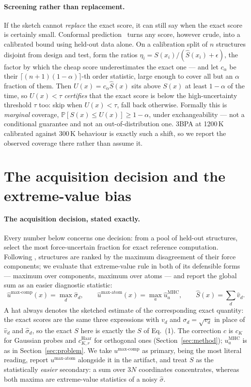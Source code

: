 \documentclass{article}
\begin{document}
\paragraph{Screening rather than replacement.}
If the sketch cannot \emph{replace} the exact score, it can still say when the exact score is
certainly small. Conformal prediction~\citep{vovk2005,crc} turns any score, however crude, into a
calibrated bound using held-out data alone. On a calibration split of $n$ structures disjoint from
design and test, form the ratios $\eta_i=S(x_i)/(\widehat S(x_i)+\epsilon)$, the factor by which
the cheap score underestimates the exact one --- and let $c_\alpha$ be their
$\lceil (n+1)(1-\alpha)\rceil$-th order statistic, large enough to cover all but an $\alpha$
fraction of them. Then $U(x)=c_\alpha\widehat S(x)$ sits above $S(x)$ at least $1-\alpha$ of the
time, so $U(x)<\tau$ \emph{certifies} that the exact score is below the high-uncertainty threshold
$\tau$ too: skip when $U(x)<\tau$, fall back otherwise. Formally this is \emph{marginal} coverage,
$\mathbb P[S(x)\le U(x)]\ge 1-\alpha$, under exchangeability --- not a conditional guarantee and not
an out-of-distribution one. 3BPA at 1200\,K calibrated against 300\,K behaviour is exactly such a
shift, so we report the observed coverage there rather than assume it.


\section{The acquisition decision and the extreme-value bias}
\label{app:acq}
\paragraph{The acquisition decision, stated exactly.}
\label{par:acq}
Every number below concerns one decision: from a pool of held-out structures, select the most
force-uncertain fraction for exact reference computation. Following \citet{beck2025mhc}, structures
are ranked by the maximum disagreement of their force components; we evaluate that extreme-value
rule in both of its defensible forms --- maximum over components, maximum over atoms --- and report
the global sum as an easier diagnostic statistic:
\begin{equation}
\widehat u^{\max\text{-comp}}(x)=\max_{d}\widehat\sigma_d,\qquad
\widehat u^{\max\text{-atom}}(x)=\max_{a}\widehat u_a^{\mathrm{MHC}},\qquad
\widehat S(x)=\sum_{d}\widehat v_d .
\end{equation}
A hat always denotes the sketched estimate of the corresponding exact quantity: the exact scores are
the same three expressions with $v_d$ and $\sigma_d=\sqrt{v_d}$ in place of $\widehat v_d$ and
$\widehat\sigma_d$, so the exact $S$ here is exactly the $S$ of Eq.~(1). The correction $c$ is
$c_K$ for Gaussian probes and $c^{\mathrm{Haar}}_{K,r}$ for orthogonal ones
(Section~\ref{sec:method}); $u_a^{\mathrm{MHC}}$ is as in Section~\ref{sec:problem}. We take
$u^{\max\text{-comp}}$ as primary, being the most literal reading, report $u^{\max\text{-atom}}$
alongside it in the artifact, and treat $S$ as the statistically \emph{easier} secondary: a sum over
$3N$ coordinates concentrates, whereas both maxima are extreme-value statistics of a noisy
$\widehat\sigma$.
\end{document}
